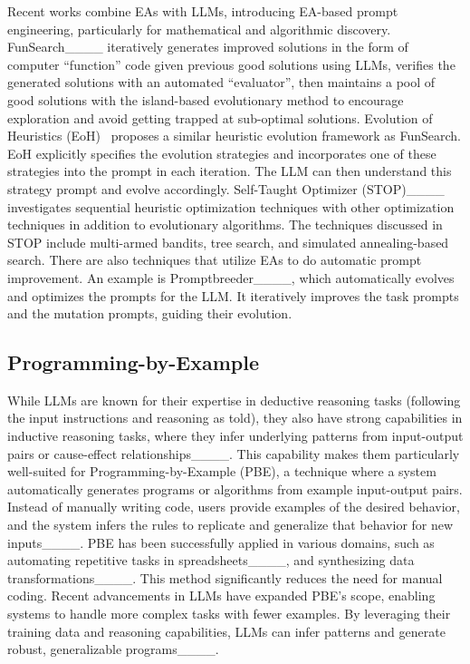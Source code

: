 Recent works combine EAs with LLMs, introducing EA-based prompt engineering, particularly for mathematical and algorithmic discovery.
FunSearch____ iteratively generates improved solutions in the form of computer ``function'' code given previous good solutions using LLMs, verifies the generated solutions with an automated ``evaluator'', then maintains a pool of good solutions with the island-based evolutionary method to encourage exploration and avoid getting trapped at sub-optimal solutions.
Evolution of Heuristics (EoH)~\cite {liu2024evolution} proposes a similar heuristic evolution framework as FunSearch.  EoH explicitly specifies the evolution strategies and incorporates one of these strategies into the prompt in each iteration. The LLM can then understand this strategy prompt and evolve accordingly. 
Self-Taught Optimizer (STOP)____ investigates sequential heuristic optimization techniques with other optimization techniques in addition to evolutionary algorithms. The techniques discussed in STOP include multi-armed bandits, tree search, and simulated annealing-based search. 
There are also techniques that utilize EAs to do automatic prompt improvement. An example is Promptbreeder____, which automatically evolves and optimizes the prompts for the LLM. 
It iteratively improves the task prompts and the mutation prompts, guiding their evolution.



\subsection{Programming-by-Example}
While LLMs are known for their expertise in deductive reasoning tasks (following the input instructions and reasoning as told), they also have strong capabilities in inductive reasoning tasks, where they infer underlying patterns from input-output pairs or cause-effect relationships____. This capability makes them particularly well-suited for Programming-by-Example (PBE), a technique where a system automatically generates programs or algorithms from example input-output pairs. Instead of manually writing code, users provide examples of the desired behavior, and the system infers the rules to replicate and generalize that behavior for new inputs____.
PBE has been successfully applied in various domains, such as automating repetitive tasks in spreadsheets____, and synthesizing data transformations____. This method significantly reduces the need for manual coding. 
Recent advancements in LLMs have expanded PBE's scope, enabling systems to handle more complex tasks with fewer examples. By leveraging their training data and reasoning capabilities, LLMs can infer patterns and generate robust, generalizable programs____.